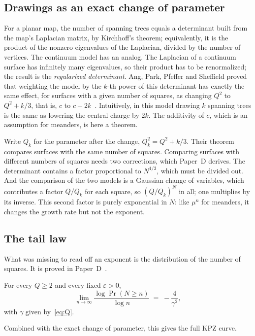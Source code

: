 \subsection{Drawings as an exact change of parameter}

For a planar map, the number of spanning trees equals a determinant built from the map's
Laplacian matrix, by Kirchhoff's theorem; equivalently, it is the product of the nonzero
eigenvalues of the Laplacian, divided by the number of vertices. The continuum model has an
analog. The Laplacian of a
continuum surface has infinitely many eigenvalues, so their product has to be renormalized; the
result is the \emph{regularized determinant}. Ang, Park, Pfeffer and Sheffield proved that
weighting the model by the $k$-th power of this determinant has exactly the same effect, for
surfaces with a given number of squares, as changing $Q^2$ to $Q^2+k/3$, that is, $c$ to
$c-2k$~\cite[Theorem~6.9]{APPS}. Intuitively, in this model drawing $k$ spanning trees is the
same as lowering the central charge by $2k$. The additivity of $c$, which is an assumption for
meanders, is here a theorem.

Write $Q_k$ for the parameter after the change, $Q_k^2=Q^2+k/3$. Their theorem compares
surfaces with the same number of squares. Comparing surfaces with different numbers of squares
needs two corrections, which Paper~D derives. The determinant contains a factor proportional to
$N^{1/3}$, which must be divided out. And the comparison of the two models is a Gaussian change of
variables, which contributes a factor $Q/Q_k$ for each square, so $(Q/Q_k)^N$ in all; one
multiplies by its inverse. This second factor is purely exponential in $N$: like $\mu^n$ for
meanders, it changes the growth rate but not the exponent.

\subsection{The tail law}

What was missing to read off an exponent is the distribution of the number of squares. It is
proved in Paper~D~\cite{PaperD}.

\begin{theorem}\label{thm:tail}
For every $Q\ge2$ and every fixed $\varepsilon>0$,
\[ \lim_{n\to\infty}\frac{\log \Pr(N\ge n)}{\log n} \;=\; -\frac{4}{\gamma^2}, \]
with $\gamma$ given by~\eqref{eq:Q}.
\end{theorem}

Combined with the exact change of parameter, this gives the full KPZ curve.

